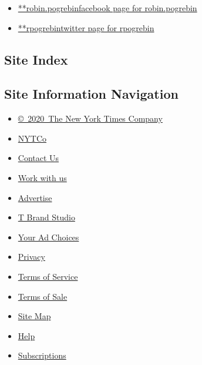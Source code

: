 \begin{itemize}
\tightlist
\item
  \href{https://www.facebookcorewwwi.onion/robin.pogrebin}{**robin.pogrebinfacebook
  page for robin.pogrebin}
\item
  \href{https://twitter.com/rpogrebin}{**rpogrebintwitter page for
  rpogrebin}
\end{itemize}

\hypertarget{site-index}{%
\subsection{Site Index}\label{site-index}}

\hypertarget{site-information-navigation}{%
\subsection{Site Information
Navigation}\label{site-information-navigation}}

\begin{itemize}
\tightlist
\item
  \href{https://help.nytimes3xbfgragh.onion/hc/en-us/articles/115014792127-Copyright-notice}{©~2020~The
  New York Times Company}
\end{itemize}

\begin{itemize}
\tightlist
\item
  \href{https://www.nytco.com/}{NYTCo}
\item
  \href{https://help.nytimes3xbfgragh.onion/hc/en-us/articles/115015385887-Contact-Us}{Contact
  Us}
\item
  \href{https://www.nytco.com/careers/}{Work with us}
\item
  \href{https://nytmediakit.com/}{Advertise}
\item
  \href{http://www.tbrandstudio.com/}{T Brand Studio}
\item
  \href{https://www.nytimes3xbfgragh.onion/privacy/cookie-policy\#how-do-i-manage-trackers}{Your
  Ad Choices}
\item
  \href{https://www.nytimes3xbfgragh.onion/privacy}{Privacy}
\item
  \href{https://help.nytimes3xbfgragh.onion/hc/en-us/articles/115014893428-Terms-of-service}{Terms
  of Service}
\item
  \href{https://help.nytimes3xbfgragh.onion/hc/en-us/articles/115014893968-Terms-of-sale}{Terms
  of Sale}
\item
  \href{https://spiderbites.nytimes3xbfgragh.onion}{Site Map}
\item
  \href{https://help.nytimes3xbfgragh.onion/hc/en-us}{Help}
\item
  \href{https://www.nytimes3xbfgragh.onion/subscription?campaignId=37WXW}{Subscriptions}
\end{itemize}
